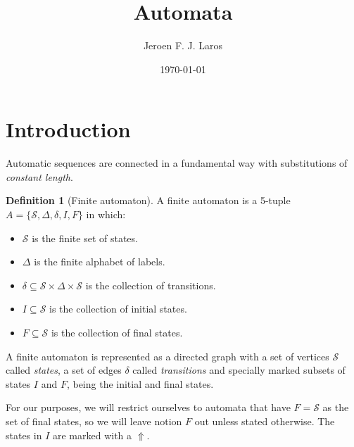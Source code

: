 \documentclass{article}
\title{Automata}
\author{Jeroen F. J. Laros}
\date{\today}
\begin{document}
\renewcommand{\qedsymbol}{$\blacksquare$}
\newcommand{\bs}{\begin{small}}
\newcommand{\es}{\end{small}}
\newcommand{\bS}{\begin{tiny}}
\newcommand{\eS}{\end{tiny}}
\newcommand{\monoit}[1]{\texttt{\textit{#1}}}

\newtheorem{theorem}{Theorem}[subsection]
\newtheorem{lemma}[theorem]{Lemma}
\newtheorem{corollary}[theorem]{Corollary}

\theoremstyle{definition}
\newtheorem{example}[theorem]{Example}
\newtheorem{definition}[theorem]{Definition}
\newtheorem{remark}[theorem]{Remark}

\maketitle

\section{Introduction}
Automatic sequences are connected in a fundamental way with substitutions of
\emph{constant length}.

\begin{definition}[Finite automaton] \label{def:finite_automaton}
A finite automaton is a 5-tuple $A = \{\mathcal{S}, \Delta, \delta, I, F\}$
in which:
\begin{itemize}
\item $\mathcal{S}$ is the finite set of states.
\item $\Delta$ is the finite alphabet of labels.
\item $\delta \subseteq \mathcal{S} \times \Delta \times \mathcal{S}$ is the 
      collection of transitions.
\item $I \subseteq \mathcal{S}$ is the collection of initial states.
\item $F \subseteq \mathcal{S}$ is the collection of final states.
\end{itemize}
\end{definition}

A finite automaton is represented as a directed graph with a set of vertices
$\mathcal{S}$ called \emph{states}, a set of edges $\delta$ called 
\emph{transitions}
and specially marked subsets of states $I$ and $F$, being the initial and final
states.

For our purposes, we will restrict ourselves to automata that have
$F = \mathcal{S}$ as the set of final states, so we will leave notion $F$
out unless stated otherwise. The states in $I$ are marked with a $\Uparrow$.
\end{document}

